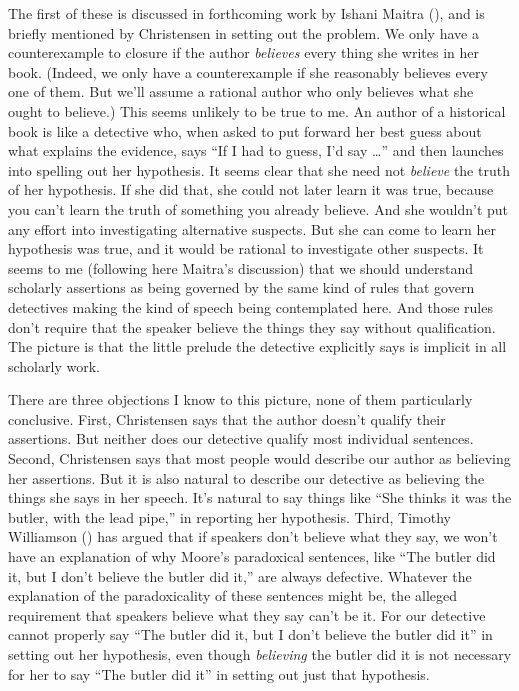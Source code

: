 \documentclass[
  10pt,
  letterpaper,
  DIV=11,
  numbers=noendperiod,
  twoside]{scrartcl}
\begin{document}
The first of these is discussed in forthcoming work by Ishani Maitra
(), and is briefly mentioned by
Christensen in setting out the problem. We only have a counterexample to
closure if the author \emph{believes} every thing she writes in her
book. (Indeed, we only have a counterexample if she reasonably believes
every one of them. But we'll assume a rational author who only believes
what she ought to believe.) This seems unlikely to be true to me. An
author of a historical book is like a detective who, when asked to put
forward her best guess about what explains the evidence, says ``If I had
to guess, I'd say \ldots{}'' and then launches into spelling out her
hypothesis. It seems clear that she need not \emph{believe} the truth of
her hypothesis. If she did that, she could not later learn it was true,
because you can't learn the truth of something you already believe. And
she wouldn't put any effort into investigating alternative suspects. But
she can come to learn her hypothesis was true, and it would be rational
to investigate other suspects. It seems to me (following here Maitra's
discussion) that we should understand scholarly assertions as being
governed by the same kind of rules that govern detectives making the
kind of speech being contemplated here. And those rules don't require
that the speaker believe the things they say without qualification. The
picture is that the little prelude the detective explicitly says is
implicit in all scholarly work.

There are three objections I know to this picture, none of them
particularly conclusive. First, Christensen says that the author doesn't
qualify their assertions. But neither does our detective qualify most
individual sentences. Second, Christensen says that most people would
describe our author as believing her assertions. But it is also natural
to describe our detective as believing the things she says in her
speech. It's natural to say things like ``She thinks it was the butler,
with the lead pipe,'' in reporting her hypothesis. Third, Timothy
Williamson () has argued that
if speakers don't believe what they say, we won't have an explanation of
why Moore's paradoxical sentences, like ``The butler did it, but I don't
believe the butler did it,'' are always defective. Whatever the
explanation of the paradoxicality of these sentences might be, the
alleged requirement that speakers believe what they say can't be it. For
our detective cannot properly say ``The butler did it, but I don't
believe the butler did it'' in setting out her hypothesis, even though
\emph{believing} the butler did it is not necessary for her to say ``The
butler did it'' in setting out just that hypothesis.
\end{document}
